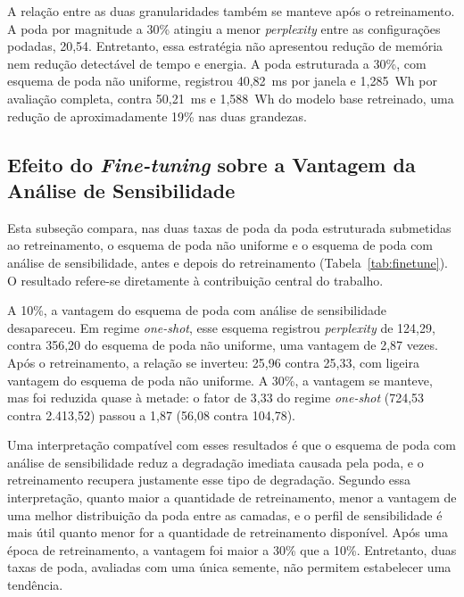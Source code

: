 A relação entre as duas granularidades também se manteve após o retreinamento. A poda por
magnitude a 30\% atingiu a menor \textit{perplexity} entre as configurações podadas, 20,54.
Entretanto, essa estratégia não apresentou
redução de memória nem redução detectável de tempo e energia. A poda estruturada a 30\%, com
esquema de poda não uniforme, registrou 40,82~ms por janela e 1,285~Wh por avaliação completa,
contra 50,21~ms e 1,588~Wh do modelo base retreinado, uma redução de aproximadamente 19\% nas
duas grandezas.

\subsection{Efeito do \textit{Fine-tuning} sobre a Vantagem da Análise de
Sensibilidade}\label{subsec:ft_corroi}

Esta subseção compara, nas duas taxas de poda da poda estruturada submetidas ao retreinamento,
o esquema de poda não uniforme e o esquema de poda com análise de sensibilidade, antes e depois
do retreinamento (Tabela~\ref{tab:finetune}). O resultado refere-se diretamente à contribuição
central do trabalho.

A 10\%, a vantagem do esquema de poda com análise de sensibilidade desapareceu. Em regime
\textit{one-shot}, esse esquema registrou \textit{perplexity} de 124,29, contra 356,20 do
esquema de poda não uniforme, uma vantagem de 2,87 vezes. Após o retreinamento, a relação se
inverteu: 25,96 contra 25,33, com ligeira vantagem do esquema de poda não uniforme. A 30\%, a
vantagem se manteve, mas foi reduzida quase à metade: o fator de 3,33 do regime
\textit{one-shot} (724,53 contra 2.413,52) passou a 1,87 (56,08 contra 104,78).

Uma interpretação compatível com esses resultados é que o esquema de poda com análise de
sensibilidade reduz a degradação imediata causada pela poda, e o retreinamento recupera
justamente esse tipo de degradação. Segundo essa interpretação, quanto maior a quantidade de
retreinamento, menor a vantagem de uma melhor distribuição da poda entre as camadas, e o perfil
de sensibilidade é mais útil quanto menor for a quantidade de retreinamento disponível. Após
uma época de retreinamento, a vantagem foi maior a 30\% que a 10\%. Entretanto, duas taxas de
poda, avaliadas com uma única semente, não permitem estabelecer uma tendência.

